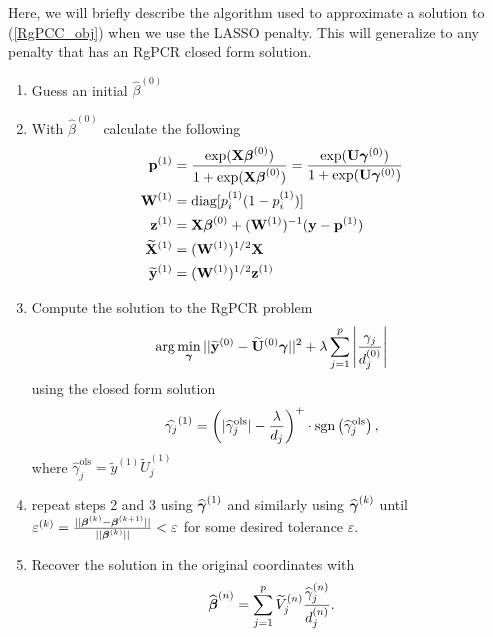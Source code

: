 \documentclass[main.tex]{subfiles}
\begin{document}
Here, we will briefly describe the algorithm used to approximate a solution to (\ref{RgPCC_obj}) when we use the LASSO penalty. This will generalize to any penalty that has an RgPCR closed form solution.

\begin{enumerate}[(Step 1)]
	\item Guess an initial $\hat{\beta}^{(0)}$
	\item With $\hat{\beta}^{(0)}$ calculate the following
		\begin{align*}
			\mathbf{p}^{(1)} &= \dfrac{\text{exp}(\mathbf{X} \boldsymbol \beta^{(0)})}{1 + \text{exp}(\mathbf{X} \boldsymbol \beta^{(0)})} = \dfrac{\text{exp}(\mathbf{U} \boldsymbol \gamma^{(0)})}{1 + \text{exp}(\mathbf{U} \boldsymbol \gamma^{(0)})}\\
			\mathbf{W}^{(1)} &= \text{diag}[p_i^{(1)}(1-p_i^{(1)})] \\
			\mathbf{z}^{(1)} &= \mathbf{X} \boldsymbol \beta^{(0)} + (\mathbf{W}^{(1)})^{-1}(\mathbf{y} - \mathbf{p}^{(1)})\\
			\widetilde{\mathbf{X}}^{(1)} &= (\mathbf{W}^{(1)})^{1/2} \mathbf{X} \\
			\widetilde{\mathbf{y}}^{(1)} &= (\mathbf{W}^{(1)})^{1/2} \mathbf{z}^{(1)}
		\end{align*}
	\item Compute the solution to the RgPCR problem
	\begin{align}
		\text{arg} \min_{\boldsymbol \gamma} ||\widetilde{\mathbf{y}}^{(0)} - \widetilde{\mathbf{U}}^{(0)} \boldsymbol \gamma ||^2 + \lambda \sum_{j = 1}^p  \left | \frac{\gamma_j}{d_j^{(0)}} \right |
	\end{align}
	using the closed form solution
	\begin{align}
		\widehat{\gamma_j}^{(1)} = \left ( |\widehat{\gamma}^{\text{ols}}_j| - \frac{\lambda}{d_j} \right )^+ \cdot \text{sgn} \left ( \widehat{\gamma}^{\text{ols}}_j \right ),
	\end{align}
	where $\hat{\gamma}^{\text{ols}}_j = \tilde{y}^{(1)} \tilde{U}^{(1)}_j$
	\item repeat steps 2 and 3 using $\widehat{\boldsymbol \gamma}^{(1)}$ and similarly using $\widehat{\boldsymbol \gamma}^{(k)}$ until $\varepsilon^{(k)} = \frac{|| \boldsymbol \beta^{(k)} - \boldsymbol \beta^{(k+1)}||}{||\boldsymbol \beta^{(k)}||} < \varepsilon$ for some desired tolerance $\varepsilon$.
	\item Recover the solution in the original coordinates with $$\widehat{\boldsymbol \beta}^{(n)} = \sum_{j = 1}^p \widetilde{V}^{(n)}_j \frac{\widehat{\gamma}_j^{(n)}}{d_j^{(n)}}.$$
\end{enumerate}

\end{document}

